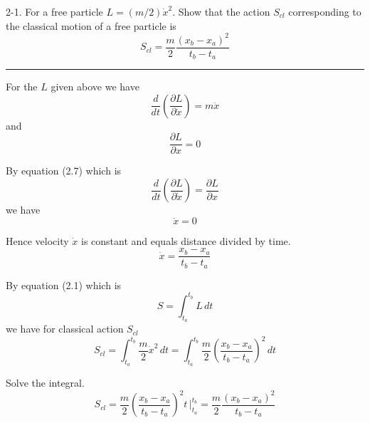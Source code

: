 \documentclass[12pt]{article}
\begin{document}
2-1.
For a free particle $L=(m/2)\dot x^2.$
Show that the action $S_{cl}$ corresponding to the classical motion
of a free particle is
\begin{equation*}
S_{cl}=\frac{m}{2}\frac{(x_b-x_a)^2}{t_b-t_a}
\tag{2.8}
\end{equation*}

\bigskip
\hrule

\bigskip
For the $L$ given above we have
\begin{equation*}
\frac{d}{dt}\left(\frac{\partial L}{\partial\dot x}\right)=m\ddot x
\end{equation*}
and
\begin{equation*}
\frac{\partial L}{\partial x}=0
\end{equation*}

By equation (2.7) which is
\begin{equation*}
\frac{d}{dt}\left(\frac{\partial L}{\partial\dot x}\right)=\frac{\partial L}{\partial x}
\end{equation*}
we have
\begin{equation*}
\ddot x=0
\end{equation*}

Hence velocity $\dot x$ is constant and equals distance divided by time.
\begin{equation*}
\dot x=\frac{x_b-x_a}{t_b-t_a}
\end{equation*}

By equation (2.1) which is
\begin{equation*}
S=\int_{t_a}^{t_b} L\,dt
\end{equation*}
we have for classical action $S_{cl}$
\begin{equation*}
S_{cl}=\int_{t_a}^{t_b}\frac{m}{2}\dot x^2\,dt=\int_{t_a}^{t_b}\frac{m}{2}\left(\frac{x_b-x_a}{t_b-t_a}\right)^2\,dt
\end{equation*}

Solve the integral.
\begin{equation*}
S_{cl}
=\frac{m}{2}\left(\frac{x_b-x_a}{t_b-t_a}\right)^2 t\,\bigg|_{t_a}^{t_b}
=\frac{m}{2}\frac{(x_b-x_a)^2}{t_b-t_a}
\end{equation*}
\end{document}
